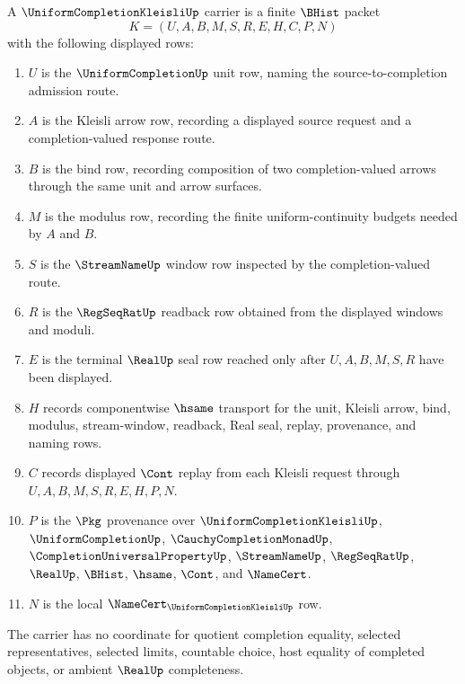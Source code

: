 \begin{definition}
\label{def:bishop-completion-kleisli-carrier}
A $\UniformCompletionKleisliUp$ carrier is a finite $\BHist$ packet
$$
K=(U,A,B,M,S,R,E,H,C,P,N)
$$
with the following displayed rows:
\begin{enumerate}
\item $U$ is the $\UniformCompletionUp$ unit row, naming the source-to-completion admission route.
\item $A$ is the Kleisli arrow row, recording a displayed source request and a completion-valued response route.
\item $B$ is the bind row, recording composition of two completion-valued arrows through the same unit and arrow surfaces.
\item $M$ is the modulus row, recording the finite uniform-continuity budgets needed by $A$ and $B$.
\item $S$ is the $\StreamNameUp$ window row inspected by the completion-valued route.
\item $R$ is the $\RegSeqRatUp$ readback row obtained from the displayed windows and moduli.
\item $E$ is the terminal $\RealUp$ seal row reached only after $U,A,B,M,S,R$ have been displayed.
\item $H$ records componentwise $\hsame$ transport for the unit, Kleisli arrow, bind, modulus, stream-window, readback, Real seal, replay, provenance, and naming rows.
\item $C$ records displayed $\Cont$ replay from each Kleisli request through $U,A,B,M,S,R,E,H,P,N$.
\item $P$ is the $\Pkg$ provenance over $\UniformCompletionKleisliUp$, $\UniformCompletionUp$, $\CauchyCompletionMonadUp$, $\CompletionUniversalPropertyUp$, $\StreamNameUp$, $\RegSeqRatUp$, $\RealUp$, $\BHist$, $\hsame$, $\Cont$, and $\NameCert$.
\item $N$ is the local $\NameCert_{\UniformCompletionKleisliUp}$ row.
\end{enumerate}
The carrier has no coordinate for quotient completion equality, selected representatives, selected limits, countable choice, host equality of completed objects, or ambient $\RealUp$ completeness.
\end{definition}


